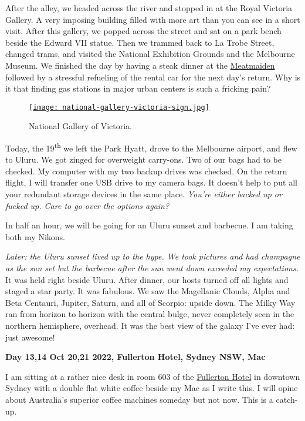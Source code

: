 After the alley, we headed across the river and stopped in at the Royal
Victoria Gallery. A very imposing building filled with more art than you
can see in a short visit. After this gallery, we popped across the
street and sat on a park bench beside the Edward VII statue. Then we
trammed back to La Trobe Street, changed trams, and visited the National
Exhibition Grounds and the Melbourne Museum. We finished the day by
having a steak dinner at the
\href{https://www.meatmaiden.com.au/}{Meatmaiden} followed by a
stressful refueling of the rental car for the next day's return. Why is
it that finding gas stations in major urban centers is such a fricking
pain?


\captionsetup[figure]{labelformat=empty}
\begin{figure}[htbp]
\centering
\href{https://conceptcontrol.smugmug.com/Trips/Overseas/Australia-New-Zealand-2022/i-LRj5GB9/A}{\texttt{[image: national-gallery-victoria-sign.jpg]}}
 \caption{National Gallery of Victoria.}
\label{fig:7573x2}
\end{figure}

Today, the 19\textsuperscript{th} we left the Park Hyatt, drove to the
Melbourne airport, and flew to Uluru. We got zinged for overweight
carry-ons. Two of our bags had to be checked. My computer with my two
backup drives was checked. On the return flight, I will transfer one USB
drive to my camera bags. It doesn't help to put all your redundant
storage devices in the same place. \emph{You're either backed up or
fucked up. Care to go over the options again?}

In half an hour, we will be going for an Uluru sunset and barbecue. I am
taking both my Nikons.

\emph{Later: the Uluru sunset lived up to the hype. We took pictures and
had champagne as the sun set but the barbecue after the sun went down
exceeded my expectations.} It was held right beside Uluru. After dinner,
our hosts turned off all lights and staged a star party. It was fabulous.
We saw the Magellanic Clouds, Alpha and Beta Centauri, Jupiter, Saturn,
and all of Scorpio: upside down. The Milky Way ran from horizon to
horizon with the central bulge, never completely seen in the northern
hemisphere, overhead. It was the best view of the galaxy I've ever had:
just awesome!

\textbf{Day 13,14 Oct 20,21 2022, Fullerton Hotel, Sydney NSW, Mac}

I am sitting at a rather nice desk in room 603 of the
\href{https://www.fullertonhotels.com/fullerton-hotel-sydney}{Fullerton
Hotel} in downtown Sydney with a double flat white coffee beside my Mac
as I write this. I will opine about Australia's superior coffee machines
someday but not now. This is a catch-up.

